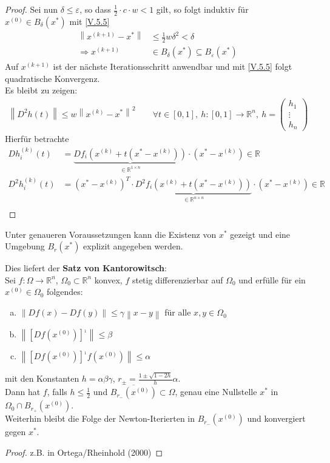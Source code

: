 \documentclass[ngerman,fontsize=11pt, paper=a4, parskip=half, titlepage=true, toc=bib]{scrbook}
\newcommand{\R}{\mathds{R}}
\newcommand{\Ren}{\mathds{R}^{n}}
\newcommand{\nn}[1]{\left\| #1 \right\|}
\begin{document}
\begin{proof}
 			Sei nun $\delta \leq \varepsilon$, so dass $\frac{1}{2} \cdot c\cdot w <1$ gilt,
 			so folgt induktiv für $x^{(0)}\in B_\delta(x^{*})$ mit \eqref{V.5.5}
 			\begin{align*}
 				\nn{x^{(k+1)}-x^{*}} &\leq \frac{1}{2}w\delta^2 < \delta\\
 				\Rightarrow x^{(k+1)}&\in B_\delta(x^{*})\subseteq B_\varepsilon(x^{*})
 			\end{align*}
 			Auf $x^{(k+1)} $ ist der nächste Iterationsschritt anwendbar
 			und mit \eqref{V.5.5} folgt quadratische Konvergenz.\\
 			Es bleibt zu zeigen:
 			\begin{gather*}
 				\nn{D^2h(t)} \leq w\nn{x^{(k)}-x^{*}}^2 \qquad \forall t\in [0,1],~
 				h:[0,1]\rightarrow\Ren,~ h=\begin{pmatrix} h_1 \\ \vdots \\ h_n \end{pmatrix}
 			\end{gather*}
 			Hierfür betrachte
 			\begin{align*}
 				Dh_i^{(k)}(t)&=\underbrace{Df_i\left( x^{(k)}+t(x^{*}-x^{(k)})\right)}_{\in \R^{1\times n}}
 							\cdot (x^{*}-x^{(k)})\in\R\\
 				D^2h_i^{(k)}(t)&=(x^{*}-x^{(k)})^T\cdot
 							\underbrace{D^2f_i\left( x^{(k)}+t(x^{*}-x^{(k)})\right)}_{\in \R^{n\times n}}
 							\cdot (x^{*}-x^{(k)})\in\R\\
 			\end{align*}
 		\end{proof}
 		
 		Unter genaueren Voraussetzungen kann die Existenz von $x^{*}$ gezeigt 
 		und eine Umgebung $B_r(x^{*})$ explizit angegeben werden.
 		
 		Dies liefert der \textbf{Satz von Kantorowitsch}:\\
 		Sei $f:\Omega\rightarrow \Ren$, $\Omega_0 \subset \Ren$ konvex,
 		 $f$ stetig differenzierbar auf $\Omega_0$ und 
 		 erfülle für ein $x^{(0)}\in \Omega_0$ folgendes:
 		 \begin{enumerate}[a)]
 		 	\item $\nn{Df(x) -Df(y)}\leq \gamma \nn{x-y}$ für alle $x,y\in \Omega_0$
 		 	\item $\nn{[Df(x^{(0)})]^{_1}} \leq \beta$
 		 	\item $\nn{[Df(x^{(0)})]^{_1}f(x^{(0)})} \leq \alpha$
 		 \end{enumerate}
 		 mit den Konstanten $h=\alpha\beta\gamma$, $r_\pm = \frac{1\pm \sqrt{1-2h}}{h}\alpha$.\\
 		 Dann hat $f$, falls $h\leq \frac{1}{2}$ und $\overline{B_{r_{-}}(x^{(0)})}\subset \Omega$,
 		 genau eine Nullstelle $x^{*}$ in $\Omega_0\cap B_{r_+}(x^{(0)})$.\\
 		 Weiterhin bleibt die Folge der Newton-Iterierten in $B_{r_{-}}(x^{(0)})$
 		 und konvergiert gegen $x^{*}$.
 		\begin{proof}
 			z.B. in Ortega/Rheinhold (2000)
 		\end{proof}
 		
\end{document}
